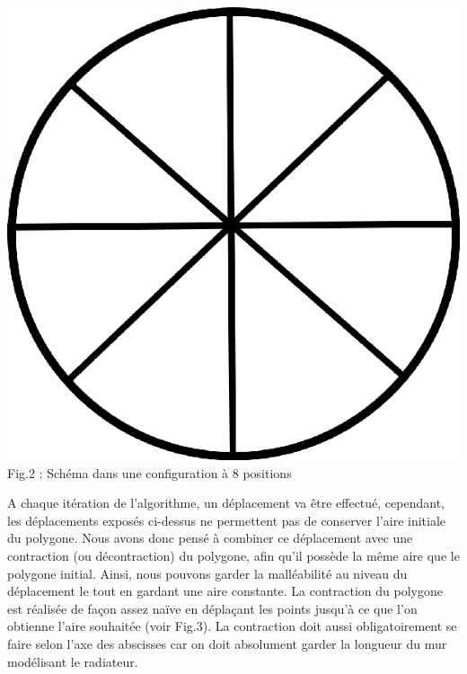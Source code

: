 \documentclass[a4paper,reqno]{article}
\begin{document}
\begin{center}
	\includegraphics[scale=0.2]{positions_circle.png}\\
	\vspace{0.2cm}
	Fig.2 : Schéma dans une configuration à 8 positions
\end{center}
\vspace{0.1cm}
\par A chaque itération de l'algorithme, un déplacement va être effectué, cependant, les déplacements exposés ci-dessus ne permettent pas de conserver l'aire initiale du polygone. Nous avons donc pensé à combiner ce déplacement avec une contraction (ou décontraction) du polygone, afin qu'il possède la même aire que le polygone initial. Ainsi, nous pouvons garder la malléabilité au niveau du déplacement le tout en gardant une aire constante. La contraction du polygone est réalisée de façon assez naïve en déplaçant les points jusqu'à ce que l'on obtienne l'aire souhaitée (voir Fig.3). La contraction doit aussi obligatoirement se faire selon l'axe des abscisses car on doit absolument garder la longueur du mur modélisant le radiateur. \\

\end{document}
